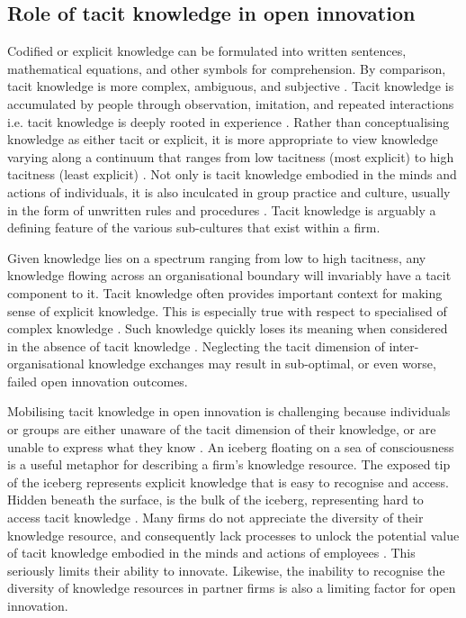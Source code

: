 \subsection{Role of tacit knowledge in open innovation}

Codified or explicit knowledge can be formulated into written sentences, mathematical equations, and other symbols for comprehension. By comparison, tacit knowledge is more complex, ambiguous, and subjective \citep{munoz2015tacit}. Tacit knowledge is accumulated by people through observation, imitation, and repeated interactions i.e. tacit knowledge is deeply rooted in experience \citep{nonaka1995knowledge}. Rather than conceptualising knowledge as either tacit or explicit, it is more appropriate to view knowledge varying along a continuum that ranges from low tacitness (most explicit) to high tacitness (least explicit) \citep{leonard1998role,chuang2016can}. Not only is tacit knowledge embodied in the minds and actions of individuals, it is also inculcated in group practice and culture, usually in the form of unwritten rules and procedures \citep{munoz2015tacit}. Tacit knowledge is arguably a defining feature of the various sub-cultures that exist within a firm. \medskip

Given knowledge lies on a spectrum ranging from low to high tacitness, any knowledge flowing across an organisational boundary will invariably have a tacit component to it. Tacit knowledge often provides important context for making sense of explicit knowledge. This is especially true with respect to specialised of complex knowledge \citep{leonard1998role,argote2000knowledge,szulanski2003sticky,amar2008descriptive}. Such knowledge quickly loses its meaning when considered in the absence of tacit knowledge \citep{amar2008descriptive,seidler2008use}. Neglecting the tacit dimension of inter\hyp{}organisational knowledge exchanges may result in sub-optimal, or even worse, failed open innovation outcomes. \medskip

Mobilising tacit knowledge in open innovation is challenging because individuals or groups are either unaware of the tacit dimension of their knowledge, or are unable to express what they know \citep{polanyi1966tacit,leonard1998role}. An iceberg floating on a sea of consciousness is a useful metaphor for describing a firm's knowledge resource. The exposed tip of the iceberg represents explicit knowledge that is easy to recognise and access. Hidden beneath the surface, is the bulk of the iceberg, representing hard to access tacit knowledge \citep{mcadam1999critical}. Many firms do not appreciate the diversity of their knowledge resource, and consequently lack processes to unlock the potential value of tacit knowledge embodied in the minds and actions of employees \citep{nonaka1994dynamic,horvath2000working}. This seriously limits their ability to innovate. Likewise, the inability to recognise the diversity of knowledge resources in partner firms is also a limiting factor for open innovation. \medskip

